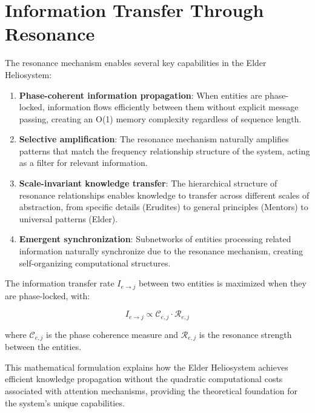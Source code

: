 \section{Information Transfer Through Resonance}

The resonance mechanism enables several key capabilities in the Elder Heliosystem:

\begin{enumerate}
    \item \textbf{Phase-coherent information propagation}: When entities are phase-locked, information flows efficiently between them without explicit message passing, creating an O(1) memory complexity regardless of sequence length.
    
    \item \textbf{Selective amplification}: The resonance mechanism naturally amplifies patterns that match the frequency relationship structure of the system, acting as a filter for relevant information.
    
    \item \textbf{Scale-invariant knowledge transfer}: The hierarchical structure of resonance relationships enables knowledge to transfer across different scales of abstraction, from specific details (Erudites) to general principles (Mentors) to universal patterns (Elder).
    
    \item \textbf{Emergent synchronization}: Subnetworks of entities processing related information naturally synchronize due to the resonance mechanism, creating self-organizing computational structures.
\end{enumerate}

\begin{theorem}
The information transfer rate $I_{e \to j}$ between two entities is maximized when they are phase-locked, with:

\begin{equation}
I_{e \to j} \propto \mathcal{C}_{e,j} \cdot \mathcal{R}_{e,j}
\end{equation}

where $\mathcal{C}_{e,j}$ is the phase coherence measure and $\mathcal{R}_{e,j}$ is the resonance strength between the entities.
\end{theorem}

This mathematical formulation explains how the Elder Heliosystem achieves efficient knowledge propagation without the quadratic computational costs associated with attention mechanisms, providing the theoretical foundation for the system's unique capabilities.